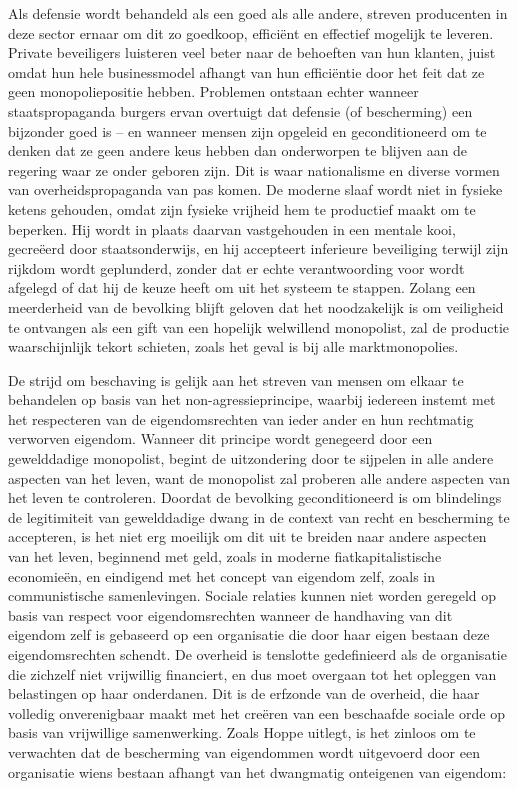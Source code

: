 \documentclass[
  a5paper,
  smalldemyvopaper,11pt,twoside,onecolumn,openright,extrafontsizes,
hidelinks]{memoir}
\begin{document}
Als defensie wordt behandeld als een goed als alle andere, streven
producenten in deze sector ernaar om dit zo goedkoop, efficiënt en
effectief mogelijk te leveren. Private beveiligers luisteren veel beter
naar de behoeften van hun klanten, juist omdat hun hele businessmodel
afhangt van hun efficiëntie door het feit dat ze geen monopoliepositie
hebben. Problemen ontstaan echter wanneer staatspropaganda burgers ervan
overtuigt dat defensie (of bescherming) een bijzonder goed is -- en
wanneer mensen zijn opgeleid en geconditioneerd om te denken dat ze geen
andere keus hebben dan onderworpen te blijven aan de regering waar ze
onder geboren zijn. Dit is waar nationalisme en diverse vormen van
overheidspropaganda van pas komen. De moderne slaaf wordt niet in
fysieke ketens gehouden, omdat zijn fysieke vrijheid hem te productief
maakt om te beperken. Hij wordt in plaats daarvan vastgehouden in een
mentale kooi, gecreëerd door staatsonderwijs, en hij accepteert
inferieure beveiliging terwijl zijn rijkdom wordt geplunderd, zonder dat
er echte verantwoording voor wordt afgelegd of dat hij de keuze heeft om
uit het systeem te stappen. Zolang een meerderheid van de bevolking
blijft geloven dat het noodzakelijk is om veiligheid te ontvangen als
een gift van een hopelijk welwillend monopolist, zal de productie
waarschijnlijk tekort schieten, zoals het geval is bij alle
marktmonopolies.

De strijd om beschaving is gelijk aan het streven van mensen om elkaar
te behandelen op basis van het non-agressieprincipe, waarbij iedereen
instemt met het respecteren van de eigendomsrechten van ieder ander en
hun rechtmatig verworven eigendom. Wanneer dit principe wordt genegeerd
door een gewelddadige monopolist, begint de uitzondering door te
sijpelen in alle andere aspecten van het leven, want de monopolist zal
proberen alle andere aspecten van het leven te controleren. Doordat de
bevolking geconditioneerd is om blindelings de legitimiteit van
gewelddadige dwang in de context van recht en bescherming te accepteren,
is het niet erg moeilijk om dit uit te breiden naar andere aspecten van
het leven, beginnend met geld, zoals in moderne fiatkapitalistische
economieën, en eindigend met het concept van eigendom zelf, zoals in
communistische samenlevingen. Sociale relaties kunnen niet worden
geregeld op basis van respect voor eigendomsrechten wanneer de
handhaving van dit eigendom zelf is gebaseerd op een organisatie die
door haar eigen bestaan deze eigendomsrechten schendt. De overheid is
tenslotte gedefinieerd als de organisatie die zichzelf niet vrijwillig
financiert, en dus moet overgaan tot het opleggen van belastingen op
haar onderdanen. Dit is de erfzonde van de overheid, die haar volledig
onverenigbaar maakt met het creëren van een beschaafde sociale orde op
basis van vrijwillige samenwerking. Zoals Hoppe uitlegt, is het zinloos
om te verwachten dat de bescherming van eigendommen wordt uitgevoerd
door een organisatie wiens bestaan afhangt van het dwangmatig onteigenen
van eigendom:
\end{document}
